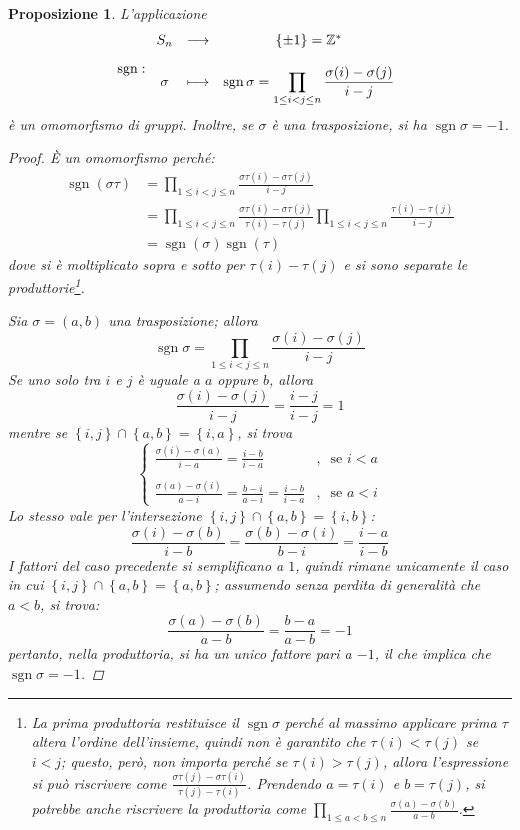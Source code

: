 \documentclass[12pt]{scrartcl}
\theoremstyle{style}
\newtheorem{prop}{Proposizione}[section]
\numberwithin{equation}{subsection}
\begin{document}
\begin{prop}
	L'applicazione 
	\[
	\operatorname{sgn} :
	\begin{array}
		{c c c}
		S_n & \longrightarrow & \left\{ \pm 1 \right\} = \mathbb{Z}^*\\
		\\
		\sigma & \longmapsto & \operatorname{sgn} \sigma =\displaystyle  \prod_{1\le i< j\le n} \frac{\sigma (i) - \sigma (j)}{i-j}
	\end{array}
	\] 
	\`e un omomorfismo di gruppi. 
	Inoltre, se $\sigma $ \`e una trasposizione, si ha $\operatorname{sgn} \sigma = -1$.
	\begin{proof}
		\`E un omomorfismo perch\'e:
		\[
			\begin{split}
				\operatorname{sgn} (\sigma \tau )&= \prod_{1\le i<j\le n} \frac{\sigma \tau (i)-\sigma \tau (j)}{i-j} \\
								 &=\prod_{1\le i<j\le n} \frac{\sigma \tau (i) - \sigma \tau (j)}{\tau (i) -\tau (j)}\prod_{1\le i<j\le n} \frac{\tau (i) - \tau (j)}{i - j}\\
								 &= \operatorname{sgn} (\sigma) \operatorname{sgn} (\tau)
			\end{split}
		\] 
		dove si \`e moltiplicato sopra e sotto per $\tau (i)-\tau (j)$ e si sono separate le produttorie\footnote{La prima produttoria restituisce il $\operatorname{sgn} \sigma $ perch\'e al massimo applicare prima $\tau $ altera l'ordine dell'insieme, quindi non \`e garantito che $\tau (i)< \tau (j)$ se $i<j$; questo, per\`o, non importa perch\'e se $\tau (i)>\tau (j)$, allora l'espressione si pu\`o riscrivere come $\frac{\sigma \tau (j) - \sigma \tau (i)}{\tau (j)-\tau (i)}$. Prendendo $a=\tau (i)$ e $b=\tau (j)$, si potrebbe anche riscrivere la produttoria come $\prod_{1\le a<b\le n} \frac{\sigma (a)-\sigma (b)}{a-b}$.}.

		Sia $\sigma =(a,b)$ una trasposizione; allora
		\[
		\operatorname{sgn} \sigma  = \prod_{1\le i<j\le n} \frac{\sigma (i)-\sigma (j)}{i-j}
		\] 
		Se uno solo tra $i$ e $j$ \`e uguale a $a$ oppure $b$, allora
		\[
		\frac{\sigma (i)-\sigma (j)}{i-j}=\frac{i-j}{i-j}=1
		\] 
		mentre se $\left\{ i,j \right\} \cap \left\{ a,b \right\} = \left\{ i,a \right\} $, si trova
		\[
			\begin{cases}
	\displaystyle 			\frac{\sigma (i) - \sigma (a)}{i-a} = \frac{i-b}{i-a}&,\ \text{ se } i<a\\
	\\
	\displaystyle \frac{\sigma (a) -\sigma (i)}{a-i}=\frac{b-i}{a-i}= \frac{i-b}{i-a}&,\ \text{ se } a < i
			\end{cases}
		\] 
		Lo stesso vale per l'intersezione $\left\{ i,j \right\} \cap \left\{ a,b \right\} = \left\{ i,b \right\} $:
		\[
		\frac{\sigma (i)-\sigma (b)}{i-b}=\frac{\sigma (b)-\sigma (i)}{b-i}=\frac{i-a}{i-b}
		\] 
		I fattori del caso precedente si semplificano a $1$, quindi rimane unicamente il caso in cui $\left\{ i,j \right\} \cap \left\{ a,b \right\} = \left\{ a,b \right\} $; assumendo senza perdita di generalit\`a che $a<b$, si trova:
		\[
		\frac{\sigma (a)-\sigma (b)}{a-b}=\frac{b-a}{a-b}=-1
		\] 
		pertanto, nella produttoria, si ha un unico fattore pari a $-1$, il che implica che $\operatorname{sgn} \sigma =-1$.
	\end{proof}
\end{prop}
\end{document}
